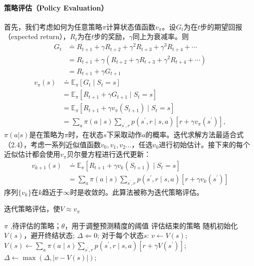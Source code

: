 \paragraph{策略评估（Policy Evaluation）}
首先，我们考虑如何为任意策略$\pi$计算状态值函数$v_{\pi}$。设$G_{t}$为在$t$步的期望回报（expected return），$R_{t}$为在$t$步的奖励，$\gamma$同上为衰减率。则
\begin{equation}
  \begin{aligned}
  G_{t} & \doteq R_{t+1}+\gamma R_{t+2}+\gamma^{2} R_{t+3}+\gamma^{3} R_{t+4}+\cdots \\
  &=R_{t+1}+\gamma\left(R_{t+2}+\gamma R_{t+3}+\gamma^{2} R_{t+4}+\cdots\right) \\
  &=R_{t+1}+\gamma G_{t+1}
  \end{aligned}
\end{equation}
\begin{equation}
  \begin{aligned}
  v_{\pi}(s) & \doteq \mathbb{E}_{\pi}\left[G_{t} \mid S_{t}=s\right] \\
  &=\mathbb{E}_{\pi}\left[R_{t+1}+\gamma G_{t+1} \mid S_{t}=s\right] \\
  &=\mathbb{E}_{\pi}\left[R_{t+1}+\gamma v_{\pi}\left(S_{t+1}\right) \mid S_{t}=s\right] \\
  &=\sum_{a} \pi(a \mid s) \sum_{s^{\prime}, r} p\left(s^{\prime}, r \mid s, a\right)\left[r+\gamma v_{\pi}\left(s^{\prime}\right)\right],
  \end{aligned}
\end{equation}
$\pi(a|s)$是在策略为$\pi$时，在状态$s$下采取动作$a$的概率。迭代求解方法最适合式（2.4），考虑一系列近似值函数$v_{0},v_{1},v_{2}\dots$，任选$v_{0}$进行初始估计。接下来的每个近似估计都会使用$v_{\pi}$贝尔曼方程\cite{dixit1990optimization}进行迭代更新：
\begin{equation}
  \begin{aligned}
  v_{k+1}(s) & \doteq \mathbb{E}_{\pi}\left[R_{t+1}+\gamma v_{k}\left(S_{t+1}\right) \mid S_{t}=s\right] \\
  &=\sum_{a} \pi(a \mid s) \sum_{s^{\prime}, r} p\left(s^{\prime}, r \mid s, a\right)\left[r+\gamma v_{k}\left(s^{\prime}\right)\right]
  \end{aligned}
\end{equation}
序列$\{v_{k}\}$在$k$趋近于$\infty$时是收敛的\cite{kamien2013dynamic}。此算法被称为迭代策略评估\cite{Sutton1998}。
\begin{algorithm}[H]
  \caption{迭代策略评估，使$V\approx v_{\pi} $}
  \begin{algorithmic}[1]
    \Require $\pi$ ,待评估的策略；$\theta$，用于调整预测精度的阈值
    \Ensure 评估结束的策略
    \State 随机初始化$V(s)$，避开终结状态;
    \Repeat
    \State $\Delta\Leftarrow 0$;
    \Loop 对于每个状态$s$:
    \State $v \leftarrow V(s)$;
    \State $V(s) \leftarrow \sum_{a} \pi(a \mid s) \sum_{s^{\prime}, r} p\left(s^{\prime}, r \mid s, a\right)\left[r+\gamma V\left(s^{\prime}\right)\right]$;
    \State $\Delta \leftarrow \max (\Delta,|v-V(s)|)$;
    \EndLoop
  \end{algorithmic}
\end{algorithm}
